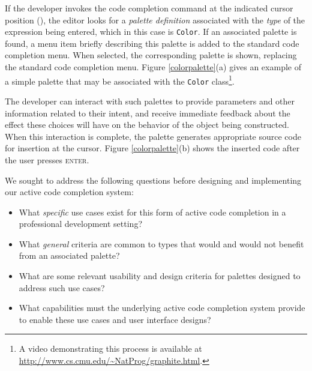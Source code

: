 If the developer invokes the code completion command at the indicated cursor position (\li{_}), the editor  looks  for a {\it palette definition} associated with the {\it type} of the expression being entered, which in this case is  \verb|Color|. If an associated palette is found, a menu item briefly describing this palette is added to the standard code completion menu. When selected, the corresponding palette is shown, replacing the standard code completion menu. Figure \ref{colorpalette}(a) gives an example of a simple palette that may be associated with the \verb|Color| class\footnote{A video demonstrating this process is available at \url{http://www.cs.cmu.edu/~NatProg/graphite.html}.}. 

The developer can interact with such palettes to provide parameters and other information related to their intent, and receive immediate feedback about the effect these choices will have on the behavior of the object being constructed. When this interaction is complete, the palette generates appropriate source code for insertion at the cursor. Figure \ref{colorpalette}(b) shows the inserted code after the user presses \textsc{enter}.

We sought to address the following questions before designing and implementing our active code completion system:

\begin{itemize}
\item What {\it specific} use cases exist for this form of active code completion in a professional development setting? 
\item What {\it general} criteria are common to types that would and would not benefit from an associated palette?
\item What are some relevant usability and design criteria for palettes designed to address such use cases?
\item What capabilities must the underlying active code completion system provide to enable these use cases and user interface designs?
\end{itemize}

